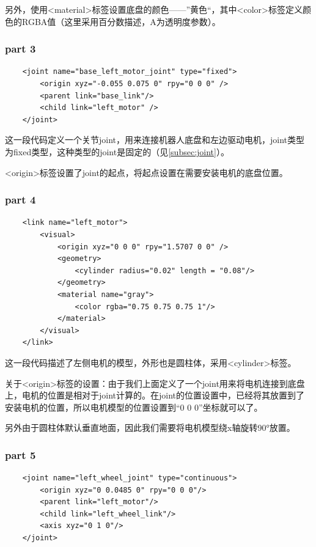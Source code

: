 \documentclass[9pt, oneside]{book}
\begin{document}
另外，使用<material>标签设置底盘的颜色——”黄色“，其中<color>标签定义颜色的RGBA值（这里采用百分数描述，A为透明度参数）。

\subsubsection{part 3}

\begin{verbatim}
    <joint name="base_left_motor_joint" type="fixed">
        <origin xyz="-0.055 0.075 0" rpy="0 0 0" />        
        <parent link="base_link"/>
        <child link="left_motor" />
    </joint>
\end{verbatim}

这一段代码定义一个关节joint，用来连接机器人底盘和左边驱动电机，joint类型为fixed类型，这种类型的joint是固定的（见\autoref{subsec:joint}）。

<origin>标签设置了joint的起点，将起点设置在需要安装电机的底盘位置。

\subsubsection{part 4}

\begin{verbatim}
    <link name="left_motor">
        <visual>
            <origin xyz="0 0 0" rpy="1.5707 0 0" />
            <geometry>
                <cylinder radius="0.02" length = "0.08"/>
            </geometry>
            <material name="gray">
                <color rgba="0.75 0.75 0.75 1"/>
            </material>
        </visual>
    </link>
\end{verbatim}

这一段代码描述了左侧电机的模型，外形也是圆柱体，采用<cylinder>标签。

关于<origin>标签的设置：由于我们上面定义了一个joint用来将电机连接到底盘上，电机的位置是相对于joint计算的。在joint的位置设置中，已经将其放置到了安装电机的位置，所以电机模型的位置设置到“0 0 0”坐标就可以了。

另外由于圆柱体默认垂直地面，因此我们需要将电机模型绕x轴旋转90°放置。

\subsubsection{part 5}

\begin{verbatim}
    <joint name="left_wheel_joint" type="continuous">
        <origin xyz="0 0.0485 0" rpy="0 0 0"/>
        <parent link="left_motor"/>
        <child link="left_wheel_link"/>
        <axis xyz="0 1 0"/>
    </joint>
\end{verbatim}
\end{document}
